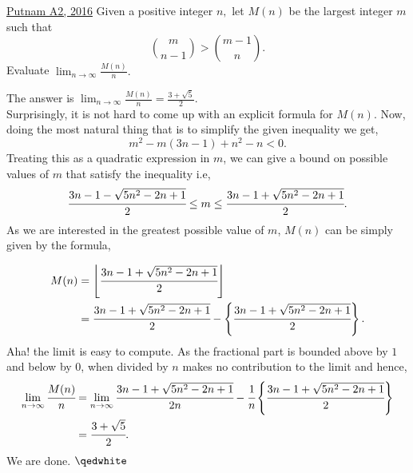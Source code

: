 \begin{problem}{2}{\href{https://artofproblemsolving.com/community/q2h1349017p34784424}{Putnam A2, 2016}} Given a positive integer $n,$ let $M(n)$ be the largest integer $m$ such that
	\[\binom{m}{n-1}>\binom{m-1}{n}.\]
	Evaluate $\lim_{n\to\infty}\frac{M(n)}{n}.$
	\begin{solution} The answer is $\lim_{n\to\infty}\tfrac{M(n)}{n}=\tfrac{3+\sqrt{5}}{2}.$\\
	\indent Surprisingly, it is not hard to come up with an explicit formula for $M(n)$. Now, doing the most natural thing that is to simplify the given inequality we get,
	$$m^2-m(3n-1)+n^2-n<0.$$
	Treating this as a quadratic expression in $m$, we can give a bound on possible values of $m$ that satisfy the inequality i.e,
$$\cfrac{3n-1-\sqrt{5n^2-2n+1}}{2}\le m\le \cfrac{3n-1+\sqrt{5n^2-2n+1}}{2}.$$
	\indent As we are interested in the greatest possible value of $m$, $M(n)$ can be simply given by the formula,
		
	\begin{align*}
		M(n) &=\left\lfloor\cfrac{3n-1+\sqrt{5n^2-2n+1}}{2}\right\rfloor\\
		&=\cfrac{3n-1+\sqrt{5n^2-2n+1}}{2}-\left\{\cfrac{3n-1+\sqrt{5n^2-2n+1}}{2}\right\}.
	\end{align*}
	\noindent Aha! the limit is easy to compute. As the fractional part is bounded above by $1$ and below by $0$, when divided by $n$ makes no contribution to the limit and hence,
	\begin{align*}
		\lim_{n\to\infty}\cfrac{M(n)}{n}&=\lim_{n\to\infty}\cfrac{3n-1+\sqrt{5n^2-2n+1}}{2n}-\cfrac{1}{n}\left\{\cfrac{3n-1+\sqrt{5n^2-2n+1}}{2}\right\}\\
		&=\cfrac{3+\sqrt{5}}{2}.
	\end{align*}
	We are done. $\qedwhite$
	\end{solution}
\end{problem}

